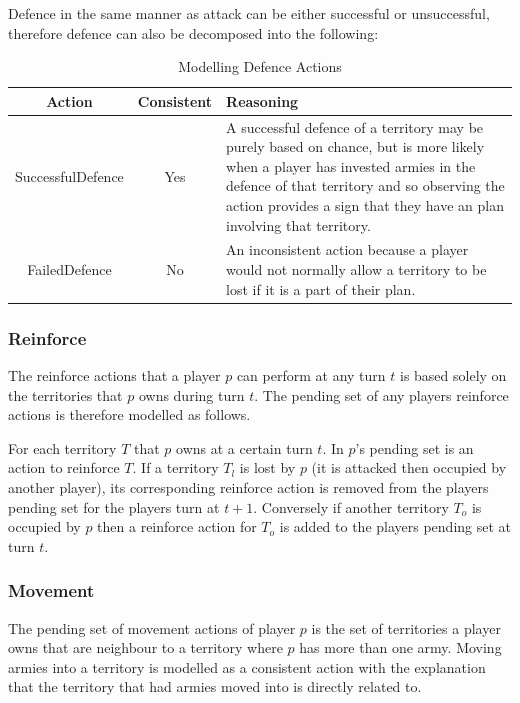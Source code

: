 \documentclass[parskip]{cs4rep}
\begin{document}
Defence in the same manner as attack can be either successful or unsuccessful, therefore defence can also be decomposed into the following: 

\begin{table}[ht]
\centering
\begin{tabular}{|c|c|p{8cm}|}
\hline 
\textbf{Action} & \textbf{Consistent}  & \textbf{Reasoning} \\ 
\hline 
SuccessfulDefence & Yes & A successful defence of a territory may be purely based on chance, but is more likely when a player has invested armies in the defence of that territory and so observing the action provides a sign that they have an plan involving that territory. \\ 
\hline 
FailedDefence & No & An inconsistent action because a player would not normally allow a territory to be lost if it is a part of their plan. \\ 
\hline
\end{tabular}
\caption{Modelling Defence Actions}
\label{table:attack-defend-modelling}
\end{table}

\newpage

\subsubsection{Reinforce}

The reinforce actions that a player $p$ can perform at any turn $t$ is based solely on the territories that $p$ owns during turn $t$. The pending set of any players reinforce actions is therefore modelled as follows. 

For each territory $T$ that $p$ owns at a certain turn $t$. In $p$'s pending set is an action to reinforce $T$. If a territory $T_{l}$ is lost by $p$ (it is attacked then occupied by another player), its corresponding reinforce action is removed from the players pending set for the players turn at $t+1$. Conversely if another territory $T_{o}$ is occupied by $p$ then a reinforce action for $T_{o}$ is added to the players pending set at turn $t$.

\subsubsection{Movement}

The pending set of movement actions of player $p$ is the set of territories a player owns that are neighbour to a territory where $p$ has more than one army. Moving armies into a territory is modelled as a consistent action with the explanation that the territory that had armies moved into is directly related to.
\end{document}
